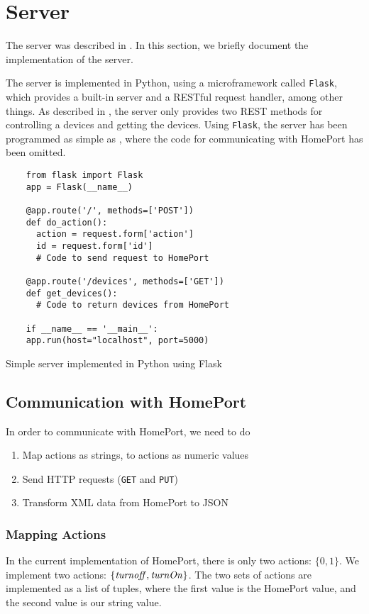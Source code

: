 \section{Server}\label{sec:serverimplementation}
The server was described in . 
In this section, we briefly document the implementation of the server.

The server is implemented in Python,
using a microframework called \texttt{Flask},
which provides a built-in server and a RESTful request handler, among other things. 
As described in , 
the server only provides two REST methods for controlling a devices and getting the devices. 
Using \texttt{Flask}, the server has been programmed as simple as , 
where the code for communicating with HomePort has been omitted. 

\begin{listing}
  \begin{verbatim}
    from flask import Flask
    app = Flask(__name__)
    
    @app.route('/', methods=['POST'])
    def do_action():
      action = request.form['action']
      id = request.form['id']
      # Code to send request to HomePort
      
    @app.route('/devices', methods=['GET'])
    def get_devices():
      # Code to return devices from HomePort
    
    if __name__ == '__main__':
    app.run(host="localhost", port=5000)
  \end{verbatim}
  \caption{Simple server implemented in Python using Flask}
  \label{lst:server}
\end{listing}

\subsection{Communication with HomePort}
In order to communicate with HomePort, 
we need to do
\begin{enumerate}
  \item Map actions as strings, to actions as numeric values
  \item Send HTTP requests (\texttt{GET} and \texttt{PUT})
  \item Transform XML data from HomePort to JSON
\end{enumerate}

\subsubsection{Mapping Actions}
In the current implementation of HomePort, 
there is only two actions: $\{0, 1\}$.
We implement two actions: $\{\var{turnoff}, \var{turnOn}\}$. 
The two sets of actions are implemented as a list of tuples, 
where the first value is the HomePort value, 
and the second value is our string value. 

